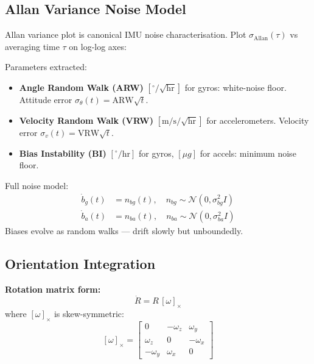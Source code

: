 \documentclass[11pt,a4paper]{article}
\begin{document}
\subsection{Allan Variance Noise Model}

Allan variance plot is canonical IMU noise characterisation. Plot $\sigma_{\text{Allan}}(\tau)$ vs averaging time $\tau$ on log-log axes:

\begin{center}
\end{center}

Parameters extracted:
\begin{itemize}
\item \textbf{Angle Random Walk (ARW)} $[^\circ/\sqrt{\text{hr}}]$ for gyros: white-noise floor. Attitude error $\sigma_\theta(t) = \mathrm{ARW}\sqrt{t}$.
\item \textbf{Velocity Random Walk (VRW)} $[\text{m/s}/\sqrt{\text{hr}}]$ for accelerometers. Velocity error $\sigma_v(t) = \mathrm{VRW}\sqrt{t}$.
\item \textbf{Bias Instability (BI)} $[^\circ/\text{hr}]$ for gyros, $[\mu g]$ for accels: minimum noise floor.
\end{itemize}

Full noise model:
\begin{align}
\dot{b}_g(t) &= n_{bg}(t), \quad n_{bg} \sim \mathcal{N}(0, \sigma_{bg}^2 I) \\
\dot{b}_a(t) &= n_{ba}(t), \quad n_{ba} \sim \mathcal{N}(0, \sigma_{ba}^2 I)
\end{align}
Biases evolve as random walks --- drift slowly but unboundedly.

\subsection{Orientation Integration}

\textbf{Rotation matrix form:}
\[
\dot{R} = R\, [\omega]_\times
\]
where $[\omega]_\times$ is skew-symmetric:
\[
[\omega]_\times = \begin{bmatrix}0 & -\omega_z & \omega_y \\ \omega_z & 0 & -\omega_x \\ -\omega_y & \omega_x & 0\end{bmatrix}
\]
\end{document}
